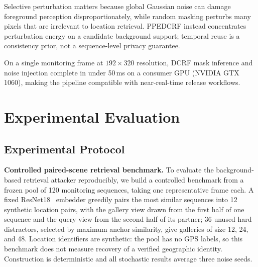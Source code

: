 \documentclass[10pt,journal]{IEEEtran}
\begin{document}
Selective perturbation matters because global Gaussian noise can damage foreground perception disproportionately, while random masking perturbs many pixels that are irrelevant to location retrieval. PPEDCRF instead concentrates perturbation energy on a candidate background support; temporal reuse is a consistency prior, not a sequence-level privacy guarantee.

On a single monitoring frame at $192\times 320$ resolution, DCRF mask inference and noise injection complete in under 50\,ms on a consumer GPU (NVIDIA GTX 1060), making the pipeline compatible with near-real-time release workflows.

\section{Experimental Evaluation}
\label{sec:experiments}

\subsection{Experimental Protocol}
\textbf{Controlled paired-scene retrieval benchmark.}
To evaluate the background-based retrieval attacker reproducibly, we build a controlled benchmark from a frozen pool of 120 monitoring sequences, taking one representative frame each. A fixed ResNet18~\cite{he2016deep} embedder greedily pairs the most similar sequences into 12 synthetic location pairs, with the gallery view drawn from the first half of one sequence and the query view from the second half of its partner; 36 unused hard distractors, selected by maximum anchor similarity, give galleries of size 12, 24, and 48. Location identifiers are synthetic: the pool has no GPS labels, so this benchmark does not measure recovery of a verified geographic identity. Construction is deterministic and all stochastic results average three noise seeds.
\end{document}
